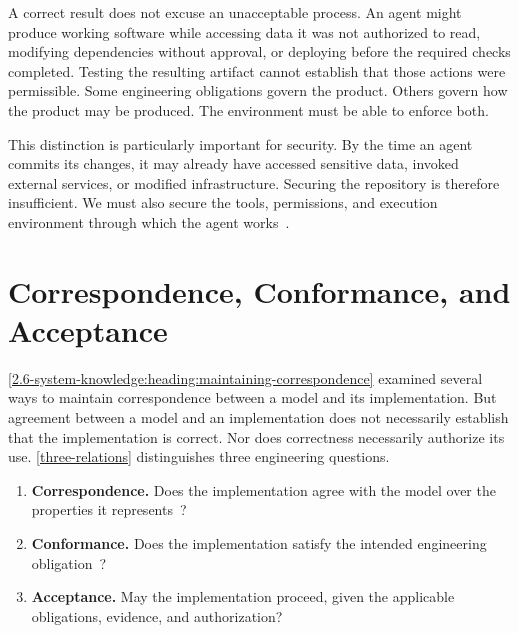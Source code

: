 A correct result does not excuse an unacceptable process. An agent might produce working software while accessing data it was not authorized to read, modifying dependencies without approval, or deploying before the required checks completed. Testing the resulting artifact cannot establish that those actions were permissible. Some engineering obligations govern the product. Others govern how the product may be produced. The environment must be able to enforce both.


This distinction is particularly important for security. By the time an agent commits its changes, it may already have accessed sensitive data, invoked external services, or modified infrastructure. Securing the repository is therefore insufficient. We must also secure the tools, permissions, and execution environment through which the agent works~\citep{snyk2026agenticlifecycle}.

\section{Correspondence, Conformance, and Acceptance}\label{heading:agreement-is-not-correctness}


\cref{2.6-system-knowledge:heading:maintaining-correspondence} examined several ways to maintain correspondence between a model and its implementation. But agreement between a model and an implementation does not necessarily establish that the implementation is correct. Nor does correctness necessarily authorize its use. \autoref{three-relations} distinguishes three engineering questions.

\begin{enumerate}
\item \textbf{Correspondence.} Does the implementation agree with the model over the properties it represents~\citep{murphy1995reflexion}?
\item \textbf{Conformance.} Does the implementation satisfy the intended engineering obligation~\citep{passos2010conformance}?
\item \textbf{Acceptance.} May the implementation proceed, given the applicable obligations, evidence, and authorization?
\end{enumerate}

